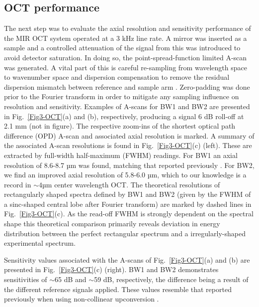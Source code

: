 \documentclass[9pt,twocolumn]{extarticle}
\begin{document}
\subsection{OCT performance}
The next step was to evaluate the axial resolution and sensitivity performance of the MIR OCT system operated at a 3 kHz line rate. A mirror was inserted as a sample and a controlled attenuation of the signal from this was introduced to avoid detector saturation. In doing so, the point-spread-function limited A-scan was generated. A vital part of this is careful re-sampling from wavelength space to wavenumber space and dispersion compensation to remove the residual dispersion mismatch between reference and sample arm \cite{bradu2018recovering}. Zero-padding was done prior to the Fourier transform in order to mitigate any sampling influence on resolution and sensitivity. 
Examples of A-scans for BW1 and BW2 are presented in Fig.~\ref{Fig3-OCT}(a) and (b), respectively, producing a signal 6 dB roll-off at 2.1 mm (not in figure). The respective zoom-ins of the shortest optical path difference (OPD) A-scan and associated axial resolution is marked. A summary of the associated A-scan resolutions is found in Fig.~\ref{Fig3-OCT}(c) (left). These are extracted by full-width half-maximum (FWHM) readings. For BW1 an axial resolution of 8.6-8.7 µm was found, matching that reported previously \cite{israelsen2019real}. For BW2, we find an improved axial resolution of 5.8-6.0 µm, which to our knowledge is a record in $\sim4$µm center wavelength OCT.
The theoretical resolutions of rectangularly shaped spectra defined by BW1 and BW2 (given by the FWHM of a sinc-shaped central lobe after Fourier transform) are marked by dashed lines in Fig.~\ref{Fig3-OCT}(c). As the read-off FWHM is strongly dependent on the spectral shape this theoretical comparison primarily reveals deviation in energy distribution between the perfect rectangular spectrum and a irregularly-shaped experimental spectrum.

Sensitivity values associated with the A-scans of Fig.~\ref{Fig3-OCT}(a) and (b) are presented in Fig.~\ref{Fig3-OCT}(c) (right). BW1 and BW2 demonstrates sensitivities of $\sim$65 dB and $\sim$59 dB, respectively, the difference being a result of the different reference signals applied. These values resemble that reported previously when using non-collinear upconversion \cite{israelsen2019real}. 
\end{document}

